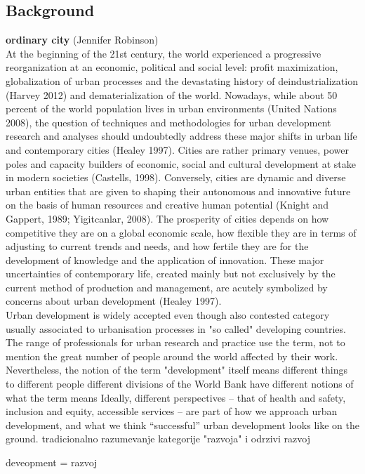 \documentclass[11pt]{report}
\begin{document}
\subsection{Background}
\textbf{ordinary city} (Jennifer Robinson)
\\
At the beginning of the 21st century, the world experienced a progressive reorganization at an economic, political and social level: profit maximization, globalization of urban processes and the devastating history of deindustrialization (Harvey 2012) and dematerialization of the world. Nowadays, while about 50 percent of the world population lives in urban environments (United Nations 2008), the question of techniques and methodologies for urban development research and analyses should undoubtedly address these major shifts in urban life and contemporary cities (Healey 1997). Cities are rather primary venues, power poles and capacity builders of economic, social and cultural development at stake in modern societies (Castells, 1998). Conversely, cities are dynamic and diverse urban entities that are given to shaping their autonomous and innovative future on the basis of human resources and creative human potential (Knight and Gappert, 1989; Yigitcanlar, 2008). The prosperity of cities depends on how competitive they are on a global economic scale, how flexible they are in terms of adjusting to current trends and needs, and how fertile they are for the development of knowledge and the application of innovation. These major uncertainties of contemporary life, created mainly but not exclusively by the current method of production and management, are acutely symbolized by concerns about urban development (Healey 1997).
\\
Urban development is widely accepted even though also contested category usually associated to urbanisation processes in "so called" developing countries. The range of professionals for urban research and practice use the term, not to mention the great number of people around the world affected by their work. Nevertheless, the notion of the term "development" itself means different things to different people
different divisions of the World Bank have different notions of what the term means
Ideally, different perspectives – that of health and safety, inclusion and equity, accessible services – are part of how we approach urban development, and what we think “successful” urban development looks like on the ground.
 tradicionalno razumevanje kategorije "razvoja" i odrzivi razvoj

deveopment = razvoj
\end{document}

